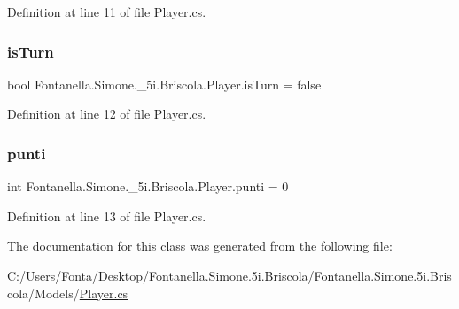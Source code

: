 Definition at line 11 of file Player.\+cs.

\hypertarget{class_fontanella_1_1_simone_1_1__5i_1_1_briscola_1_1_player_ad2b525444ebc7aa1baeff6aee7020ad0}{}\label{class_fontanella_1_1_simone_1_1__5i_1_1_briscola_1_1_player_ad2b525444ebc7aa1baeff6aee7020ad0} 
\subsubsection{\texorpdfstring{is\+Turn}{isTurn}}
{\footnotesize\ttfamily bool Fontanella.\+Simone.\+\_\+5i.\+Briscola.\+Player.\+is\+Turn = false}



Definition at line 12 of file Player.\+cs.

\hypertarget{class_fontanella_1_1_simone_1_1__5i_1_1_briscola_1_1_player_aa67dff030186e73f9e6ca595db566793}{}\label{class_fontanella_1_1_simone_1_1__5i_1_1_briscola_1_1_player_aa67dff030186e73f9e6ca595db566793} 
\subsubsection{\texorpdfstring{punti}{punti}}
{\footnotesize\ttfamily int Fontanella.\+Simone.\+\_\+5i.\+Briscola.\+Player.\+punti = 0}



Definition at line 13 of file Player.\+cs.



The documentation for this class was generated from the following file\+:\begin{DoxyCompactItemize}
\item 
C\+:/\+Users/\+Fonta/\+Desktop/\+Fontanella.\+Simone.\+5i.\+Briscola/\+Fontanella.\+Simone.\+5i.\+Briscola/\+Models/\hyperlink{_player_8cs}{Player.\+cs}\end{DoxyCompactItemize}
